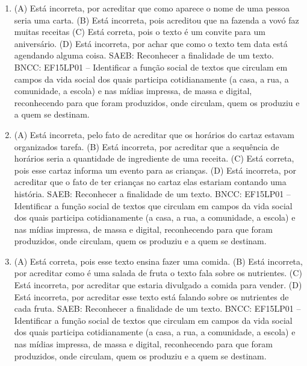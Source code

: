 
\begin{enumerate}
\item
(A) Está incorreta, por acreditar que como aparece o nome de uma pessoa seria uma carta.
(B) Está incorreta, pois acreditou que na fazenda a vovó faz muitas receitas
(C) Está correta, pois o texto é um convite para um aniversário.
(D) Está incorreta, por achar que como o texto tem data está agendando alguma coisa.
SAEB: Reconhecer a finalidade de um texto.
BNCC: EF15LP01 -- Identificar a função social de textos que
circulam em campos da vida social dos quais participa cotidianamente (a
casa, a rua, a comunidade, a escola) e nas mídias impressa, de massa e
digital, reconhecendo para que foram produzidos, onde circulam, quem os
produziu e a quem se destinam.

\item
(A) Está incorreta, pelo fato de acreditar que os horários do cartaz
estavam organizados tarefa.
(B) Está incorreta, por acreditar que a sequência de horários seria a
quantidade de ingrediente de uma receita.
(C) Está correta, pois esse cartaz informa um evento para as crianças.
(D) Está incorreta, por acreditar que o fato de ter crianças no cartaz
elas estariam contando uma história.
SAEB: Reconhecer a finalidade de um texto.
BNCC: EF15LP01 -- Identificar a função social de textos que
circulam em campos da vida social dos quais participa cotidianamente (a
casa, a rua, a comunidade, a escola) e nas mídias impressa, de massa e
digital, reconhecendo para que foram produzidos, onde circulam, quem os
produziu e a quem se destinam.

\item
(A) Está correta, pois esse texto ensina fazer uma comida.
(B) Está incorreta, por acreditar como é uma salada de fruta o texto fala sobre os nutrientes.
(C) Está incorreta, por acreditar que estaria divulgado a comida para vender.
(D) Está incorreta, por acreditar esse texto está falando sobre os
nutrientes de cada fruta.
SAEB: Reconhecer a finalidade de um texto.
BNCC: EF15LP01 -- Identificar a função social de textos que
circulam em campos da vida social dos quais participa cotidianamente (a
casa, a rua, a comunidade, a escola) e nas mídias impressa, de massa e
digital, reconhecendo para que foram produzidos, onde circulam, quem os
produziu e a quem se destinam.
\end{enumerate}


